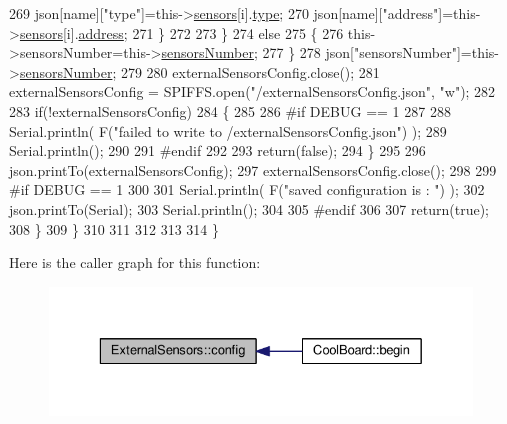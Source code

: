 \begin{DoxyCode}
269                     json[name][\textcolor{stringliteral}{"type"}]=this->\hyperlink{classExternalSensors_a284233f884fcf00154a44740cf1d9e1e}{sensors}[i].\hyperlink{structExternalSensors_1_1sensor_a6acfdb02c742c2110d7bd2b5d9fce9e7}{type};
270                     json[name][\textcolor{stringliteral}{"address"}]=this->\hyperlink{classExternalSensors_a284233f884fcf00154a44740cf1d9e1e}{sensors}[i].\hyperlink{structExternalSensors_1_1sensor_a8d70ca58524521ed054fc6b81eb58d34}{address};
271                 \}
272  
273             \}
274             \textcolor{keywordflow}{else}
275             \{
276                 this->sensorsNumber=this->\hyperlink{classExternalSensors_a58e4fbf9adeae787d92be5fa33043b5d}{sensorsNumber};
277             \}
278             json[\textcolor{stringliteral}{"sensorsNumber"}]=this->\hyperlink{classExternalSensors_a58e4fbf9adeae787d92be5fa33043b5d}{sensorsNumber};
279 
280             externalSensorsConfig.close();
281             externalSensorsConfig = SPIFFS.open(\textcolor{stringliteral}{"/externalSensorsConfig.json"}, \textcolor{stringliteral}{"w"});
282 
283             \textcolor{keywordflow}{if}(!externalSensorsConfig)
284             \{
285             
286 \textcolor{preprocessor}{            #if DEBUG == 1 }
287 
288                 Serial.println( F(\textcolor{stringliteral}{"failed to write to /externalSensorsConfig.json"}) );
289                 Serial.println();
290             
291 \textcolor{preprocessor}{            #endif}
292 
293                 \textcolor{keywordflow}{return}(\textcolor{keyword}{false});
294             \}
295             
296             json.printTo(externalSensorsConfig);
297             externalSensorsConfig.close();
298             
299 \textcolor{preprocessor}{        #if DEBUG == 1 }
300 
301             Serial.println( F(\textcolor{stringliteral}{"saved configuration is : "}) );
302             json.printTo(Serial);
303             Serial.println();
304         
305 \textcolor{preprocessor}{        #endif}
306 
307             \textcolor{keywordflow}{return}(\textcolor{keyword}{true}); 
308         \}
309     \}   
310     
311 
312 
313 
314 \}
\end{DoxyCode}
Here is the caller graph for this function\+:\nopagebreak
\begin{figure}[H]
\begin{center}
\leavevmode
\includegraphics[width=329pt]{classExternalSensors_a862a4bd11346b37270d0244c2adabe5a_icgraph}
\end{center}
\end{figure}
\mbox{\label{classExternalSensors_a78c2bf55084435dd51d3c559b2d3c6f3}} 
